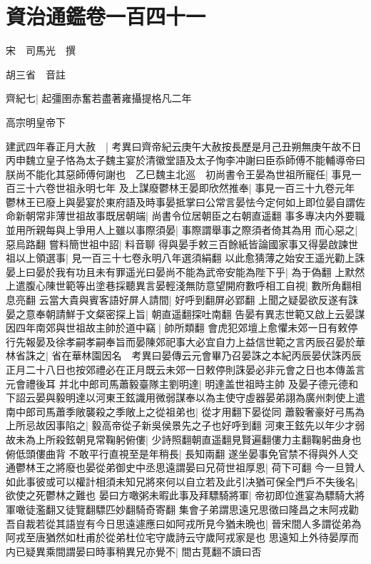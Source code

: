 \chapter{資治通鑑卷一百四十一}
宋　司馬光　撰

胡三省　音註

齊紀七|{
	起彊圉赤奮若盡著雍攝提格凡二年}


高宗明皇帝下

建武四年春正月大赦　|{
	考異曰齊帝紀云庚午大赦按長歷是月己丑朔無庚午故不日}
丙申魏立皇子恪為太子魏主宴於清徽堂語及太子恂李冲謝曰臣忝師傅不能輔導帝曰朕尚不能化其惡師傅何謝也　乙巳魏主北巡　初尚書令王晏為世祖所寵任|{
	事見一百三十六卷世祖永明七年}
及上謀廢鬱林王晏即欣然推奉|{
	事見一百三十九卷元年}
鬱林王已廢上與晏宴於東府語及時事晏抵掌曰公常言晏怯今定何如上即位晏自謂佐命新朝常非薄世祖故事既居朝端|{
	尚書令位居朝臣之右朝直遥翻}
事多專决内外要職並用所親每與上爭用人上雖以事際須晏|{
	事際謂舉事之際須者倚其為用}
而心惡之|{
	惡烏路翻}
嘗料簡世祖中詔|{
	料音聊}
得與晏手敕三百餘紙皆論國家事又得晏啟諫世祖以上領選事|{
	見一百三十七卷永明八年選須絹翻}
以此愈猜薄之始安王遥光勸上誅晏上曰晏於我有功且未有罪遥光曰晏尚不能為武帝安能為陛下乎|{
	為于偽翻}
上默然上遣腹心陳世範等出塗巷採聽異言晏輕淺無防意望開府數呼相工自視|{
	數所角翻相息亮翻}
云當大貴與賓客語好屏人請間|{
	好呼到翻屏必郢翻}
上聞之疑晏欲反遂有誅晏之意奉朝請鮮于文粲密探上旨|{
	朝直遥翻探吐南翻}
告晏有異志世範又啟上云晏謀因四年南郊與世祖故主帥於道中竊|{
	帥所類翻}
會虎犯郊壇上愈懼未郊一日有敕停行先報晏及徐孝嗣孝嗣奉旨而晏陳郊祀事大必宜自力上益信世範之言丙辰召晏於華林省誅之|{
	省在華林園因名　考異曰晏傳云元會畢乃召晏誅之本紀丙辰晏伏誅丙辰正月二十八日也按郊禮必在正月既云未郊一日敕停則誅晏必非元會之日也本傳盖言元會禮後耳}
并北中郎司馬蕭毅臺隊主劉明達|{
	明達盖世祖時主帥}
及晏子德元德和下詔云晏與毅明達以河東王鉉識用微弱謀奉以為主使守虛器晏弟詡為廣州刺使上遣南中郎司馬蕭季敞襲殺之季敞上之從祖弟也|{
	從才用翻下晏從同}
蕭毅奢豪好弓馬為上所忌故因事陷之|{
	毅高帝從子新吳侯景先之子也好呼到翻}
河東王鉉先以年少才弱故未為上所殺鉉朝見常鞠躬俯僂|{
	少詩照翻朝直遥翻見賢遍翻僂力主翻鞠躬曲身也俯低頭僂曲背}
不敢平行直視至是年稍長|{
	長知兩翻}
遂坐晏事免官禁不得與外人交通鬱林王之將廢也晏從弟御史中丞思遠謂晏曰兄荷世祖厚恩|{
	荷下可翻}
今一旦贊人如此事彼或可以權計相須未知兄將來何以自立若及此引决猶可保全門戶不失後名|{
	欲使之死鬱林之難也}
晏曰方噉粥未暇此事及拜驃騎將軍|{
	帝初即位進宴為驃騎大將軍噉徒濫翻又徒覽翻驃匹妙翻騎奇寄翻}
集會子弟謂思遠兄思徵曰隆昌之末阿戎勸吾自裁若從其語豈有今日思遠遽應曰如阿戎所見今猶未晩也|{
	晉宋間人多謂從弟為阿戎至唐猶然如杜甫於從弟杜位宅守歲詩云守歲阿戎家是也}
思遠知上外待晏厚而内已疑異乘間謂晏曰時事稍異兄亦覺不|{
	間古莧翻不讀曰否}
